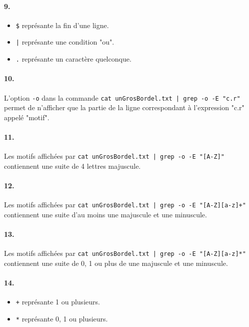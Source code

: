 \paragraph{9.}
\begin{itemize}
\item \texttt{\$} représante la fin d'une ligne.
\item \texttt{|} représante une condition "ou".
\item \texttt{.} représante un caractère quelconque.
\end{itemize}

\paragraph{10.}
L'option \texttt{-o} dans la commande \texttt{cat unGrosBordel.txt | grep -o -E "c.r"} permet de n’afficher que la partie de la ligne correspondant à l’expression "c.r" appelé "motif".

\paragraph{11.}
Les motifs affichées par \texttt{cat unGrosBordel.txt | grep -o -E "[A-Z]"} contiennent une suite de 4 lettres majuscule.

\paragraph{12.}
Les motifs affichées par \texttt{cat unGrosBordel.txt | grep -o -E "[A-Z][a-z]+"} contiennent une suite d'au moins une majuscule et une minuscule.

\paragraph{13.}
Les motifs affichées par \texttt{cat unGrosBordel.txt | grep -o -E "[A-Z][a-z]*"} contiennent une suite de 0, 1 ou plus de une majuscule et une minuscule.

\paragraph{14.}
\begin{itemize}
\item \texttt{+} représante 1 ou plusieurs.
\item \texttt{*} représante 0, 1 ou plusieurs.
\end{itemize}

